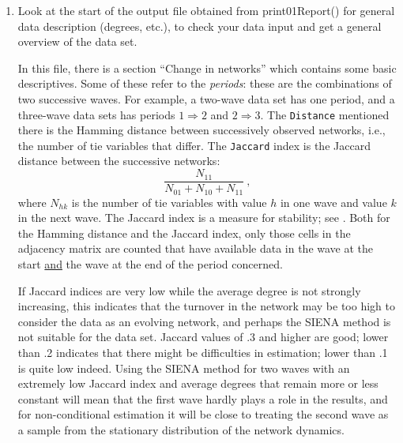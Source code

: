 \documentclass[a4paper,fleqn,11pt]{article}
\newcommand{\+}{\, + \,}
\newcommand{\sfn}[1]{\textsf{#1}}
\newcommand{\SI}{{\sf SIENA }}
\begin{document}
\begin{enumerate}
\item Look at the start of the output file obtained from
       \sfn{print01Report()} for general data
      description (degrees, etc.), to check your data input
      and get a general overview of the data set.

      In this file, there is a section ``Change in networks'' which contains
      some basic descriptives. Some of these refer to the \emph{periods}:
      these are the combinations of two successive waves.
      For example, a two-wave data set has one period, and a
      three-wave data sets has periods $1 \Rightarrow 2$ and $2 \Rightarrow 3$.
      The \texttt{Distance} mentioned there
      is the Hamming distance between successively observed networks, i.e.,
      the number of tie variables that differ.
      The \texttt{Jaccard} index is the Jaccard distance between the
      successive networks:
      \[
         \frac{N_{11}}{N_{01}+N_{10}+N_{11}} \ ,
      \]
      where $N_{hk}$ is the number of tie variables with value $h$ in one
      wave and value $k$ in the next wave. The Jaccard index is a measure for
      stability; see \citet{SnijdersEA10b}.
      Both for the Hamming distance and the Jaccard index, only those cells
      in the adjacency matrix are counted that have available data in the wave
      at the start \underline{and} the wave at the end of the period concerned.

      If Jaccard indices are very low while the average
      degree is not strongly increasing, this indicates
      that the turnover in the network may be too high to consider
      the data as an evolving network, and perhaps the \SI method
      is not suitable for the data set. Jaccard values of .3 and higher
      are good; lower than .2 indicates that there might be difficulties
      in estimation; lower than .1 is quite low indeed.
      Using the \SI method for two waves with an extremely low Jaccard
      index and average degrees that remain more or less constant
      will mean that the first wave hardly plays a role in the results, and
      for non-conditional estimation it will be close to treating the second wave as
      a sample from the stationary distribution of the network dynamics.


\end{enumerate}
\end{document}
